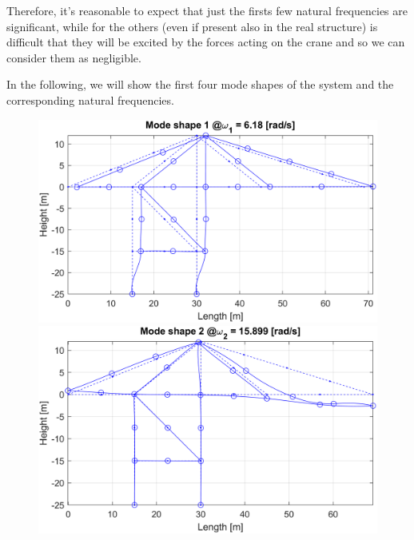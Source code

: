 Therefore, it's reasonable to expect that just the firsts few natural frequencies are significant, while for the others (even if present also in the real structure) is difficult that they will be excited by the forces acting on the crane and so we can consider them as negligible.

In the following, we will show the first four mode shapes of the system and the corresponding natural frequencies.

\begin{figure}[H]
    \begin{minipage}[b]{0.45\textwidth}
        \centering
        \includegraphics[width=\textwidth]{img/MATLAB/ModeShapes/Mode_01.png}
    \end{minipage}
    \hfill
    \begin{minipage}[b]{0.45\textwidth}
        \centering
        \includegraphics[width=\textwidth]{img/MATLAB/ModeShapes/Mode_02.png}
    \end{minipage}
    \begin{minipage}[b]{0.45\textwidth}

\end{minipage}
\end{figure}
